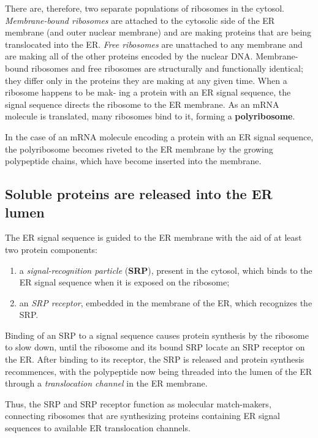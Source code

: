 There are, therefore, two separate populations of ribosomes in the cytosol.
\textit{Membrane-bound ribosomes} are attached to the cytosolic side of the
ER membrane (and outer nuclear membrane) and are making proteins
that are being translocated into the ER. \textit{Free ribosomes} are unattached
to any membrane and are making all of the other proteins encoded by
the nuclear DNA. Membrane-bound ribosomes and free ribosomes are
structurally and functionally identical; they differ only in the proteins they
are making at any given time. When a ribosome happens to be mak-
ing a protein with an ER signal sequence, the signal sequence directs
the ribosome to the ER membrane. As an mRNA molecule is translated,
many ribosomes bind to it, forming a \textbf{polyribosome}.

In the case of an mRNA molecule encoding a protein with an ER signal
sequence, the polyribosome becomes riveted to the ER membrane by the
growing polypeptide chains, which have become inserted into the membrane.

\subsection{Soluble proteins are released into the ER lumen}

The ER signal sequence is guided to the ER membrane with the aid of
at least two protein components:

\begin{enumerate}
\item a \textit{signal-recognition particle} (\textbf{SRP}), present in the cytosol, which binds 
to the ER signal sequence when it is exposed on the ribosome;
\item an \textit{SRP receptor}, embedded in the membrane of the ER, which recognizes the SRP.
\end{enumerate}

Binding of an SRP to a signal sequence causes protein synthesis by the ribosome to slow down,
until the ribosome and its bound SRP locate an SRP receptor on the ER.
After binding to its receptor, the SRP is released and protein synthesis
recommences, with the polypeptide now being threaded into the lumen
of the ER through a \textit{translocation channel} in the ER membrane.

Thus, the SRP and SRP receptor function as molecular match-makers, 
connecting ribosomes that are synthesizing proteins containing
ER signal sequences to available ER translocation channels.

